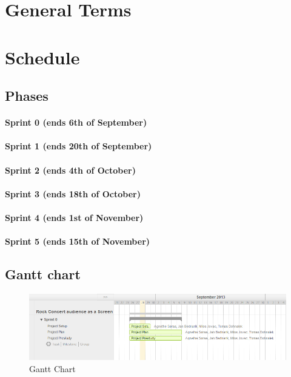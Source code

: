 \documentclass{article}
\begin{document}
\section{General Terms}
\section{Schedule}
\subsection{Phases}
\paragraph{Sprint 0 (ends 6th of September)}
\paragraph{Sprint 1 (ends 20th of September)}
\paragraph{Sprint 2 (ends 4th of October)}
\paragraph{Sprint 3 (ends 18th of October)}
\paragraph{Sprint 4 (ends 1st of November)}
\paragraph{Sprint 5 (ends 15th of November)}
\subsection{Gantt chart}

\begin{figure}[ht]
\begin{center}
    \includegraphics[scale=0.6]{images/gantt}
    \caption{Gantt Chart}
    \label{img:gantt}
\end{center}
\end{figure}
\end{document}
